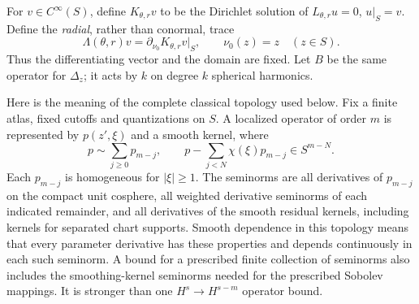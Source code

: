 \documentclass[11pt]{article}
\theoremstyle{definition}
\theoremstyle{remark}
\numberwithin{equation}{section}
\providecommand{\tht}{\theta}
\begin{document}
For $v\in C^\infty(S)$, define $K_{\tht,r}v$ to be the Dirichlet solution
of $L_{\tht,r}u=0$, $u|_S=v$. Define the \emph{radial}, rather than
conormal, trace
\begin{equation}\label{family-supp:eq:DNdef}
 \Lambda(\tht,r)v=\partial_{\nu_0}K_{\tht,r}v|_S,
 \qquad \nu_0(z)=z\quad(z\in S).
\end{equation}
Thus the differentiating vector and the domain are fixed. Let $B$ be the
same operator for $\Delta_z$; it acts by $k$ on degree $k$ spherical harmonics.

Here is the meaning of the complete classical topology used below. Fix a
finite atlas, fixed cutoffs and quantizations on $S$. A localized operator
of order $m$ is represented by $p(z',\xi)$ and a smooth kernel, where
\[
 p\sim\sum_{j\geq0}p_{m-j},\qquad
 p-\sum_{j<N}\chi(\xi)p_{m-j}\in S^{m-N}.
\]
Each $p_{m-j}$ is homogeneous for $|\xi|\geq1$. The seminorms are all
derivatives of $p_{m-j}$ on the compact unit cosphere, all weighted
derivative seminorms of each indicated remainder, and all derivatives of
the smooth residual kernels, including kernels for separated chart
supports. Smooth dependence in this topology means that every parameter
derivative has these properties and depends continuously in each such
seminorm. A bound for a prescribed finite collection of seminorms also
includes the smoothing-kernel seminorms needed for the prescribed Sobolev
mappings. It is stronger than one $H^s\to H^{s-m}$ operator bound.
\end{document}
